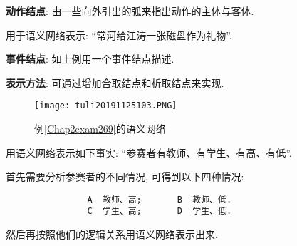 \textbf{动作结点}: 由一些向外引出的弧来指出动作的主体与客体.
\begin{example}\label{Chap2exam269}
用于语义网络表示: “常河给江涛一张磁盘作为礼物”.
\end{example}

\textbf{事件结点}: 如上例用一个事件结点描述.

\textbf{表示方法}: 可通过增加合取结点和析取结点来实现.
\begin{figure}[H]
\centering
\texttt{[image: tuli20191125103.PNG]}
\vspace{-0.3cm}
\caption{例\ref{Chap2exam269}的语义网络}
\label{AI32fig103}
\end{figure}
\begin{example}\label{Chap2exam270}
用语义网络表示如下事实: “参赛者有教师、有学生、有高、有低”.
\end{example}
首先需要分析参赛者的不同情况, 可得到以下四种情况:
\begin{center}
\begin{Verbatim}
                A  教师、高;       B  教师、低.
                C  学生、高;       D  学生、低.
\end{Verbatim}
\end{center}
然后再按照他们的逻辑关系用语义网络表示出来.

